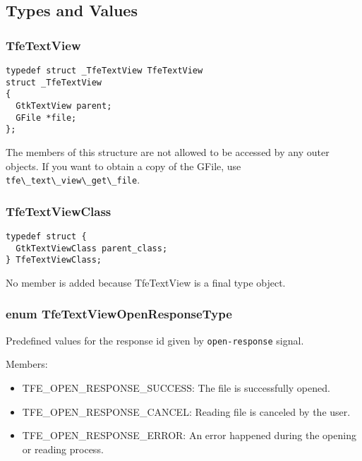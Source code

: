 \hypertarget{types-and-values-1}{%
\subsection{Types and Values}\label{types-and-values-1}}

\hypertarget{tfetextview}{%
\subsubsection{TfeTextView}\label{tfetextview}}

\begin{lstlisting}
typedef struct _TfeTextView TfeTextView
struct _TfeTextView
{
  GtkTextView parent;
  GFile *file;
};
\end{lstlisting}

The members of this structure are not allowed to be accessed by any
outer objects. If you want to obtain a copy of the GFile, use
\passthrough{\lstinline!tfe\_text\_view\_get\_file!}.

\hypertarget{tfetextviewclass}{%
\subsubsection{TfeTextViewClass}\label{tfetextviewclass}}

\begin{lstlisting}
typedef struct {
  GtkTextViewClass parent_class;
} TfeTextViewClass;
\end{lstlisting}

No member is added because TfeTextView is a final type object.

\hypertarget{enum-tfetextviewopenresponsetype}{%
\subsubsection{enum
TfeTextViewOpenResponseType}\label{enum-tfetextviewopenresponsetype}}

Predefined values for the response id given by
\passthrough{\lstinline!open-response!} signal.

Members:

\begin{itemize}
\tightlist
\item
  TFE\_OPEN\_RESPONSE\_SUCCESS: The file is successfully opened.
\item
  TFE\_OPEN\_RESPONSE\_CANCEL: Reading file is canceled by the user.
\item
  TFE\_OPEN\_RESPONSE\_ERROR: An error happened during the opening or
  reading process.
\end{itemize}

